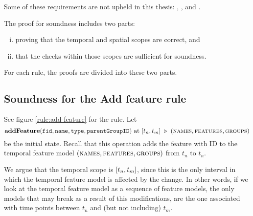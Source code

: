 Some of these requirements are not upheld in this thesis: , , and . 

The proof for soundness includes two parts: 
\begin{enumerate}[(i)]
   \item proving that the temporal and spatial scopes are correct, and
   \item that the checks within those scopes are sufficient for soundness.
\end{enumerate}
For each rule, the proofs are divided into these two parts.

   

\subsection{Soundness for the Add feature rule}
\label{sub:soundness-for-the-add-feature-rule}

See figure \vref{rule:add-feature} for the  rule.
Let 
\[ \textbf{addFeature}(\var{fid}, \var{name}, \var{type}, \var{parentGroupID})\text{ at }\interval{t_n}{t_m}
\shove (\names{}, \features{}, \groups{})
\]
be the initial state. Recall that this operation adds the feature with ID  to the temporal feature model $(\textsc{names}{}, \textsc{features}{}, \textsc{groups}{}{})$ from $t_n$ to $t_n$.

We argue that the temporal scope is $\interval{t_n}{t_m}$, since this is the only interval in which the temporal feature model is affected by the change. In other words, if we look at the temporal feature model as a sequence of feature models, the only models that may break as a result of this modifications, are the one associated with time points between $t_n$ and (but not including) $t_m$. 
